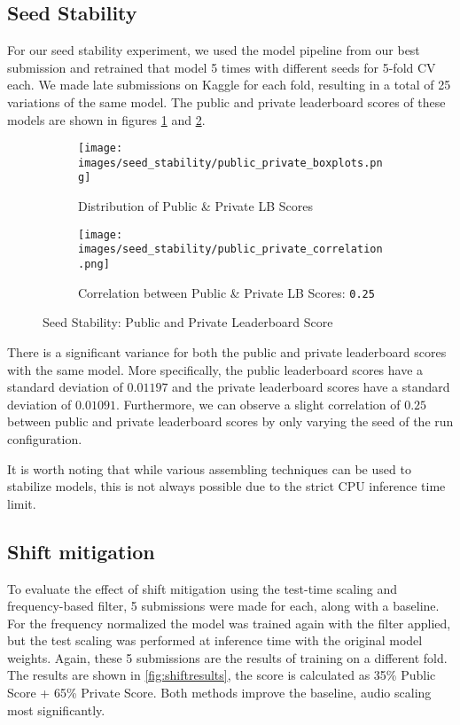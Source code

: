 \documentclass[
]{ceurart}
\begin{document}
\subsection{Seed Stability} \label{seed}

For our seed stability experiment, we used the model pipeline from our best submission and retrained that model 5 times with different seeds for 5-fold CV each. We made late submissions on Kaggle for each fold, resulting in a total of 25 variations of the same model. The public and private leaderboard scores of these models are shown in figures \ref{fig:seed-stability-lb-scores} and \ref{fig:seed-stability-lb-corr}.

\begin{figure}[htbp]
    \centering
    \begin{subfigure}[b]{0.39\textwidth}
        \centering
        \texttt{[image: images/seed\_stability/public\_private\_boxplots.png]}
        \caption{Distribution of Public \& Private LB Scores}
        \label{fig:seed-stability-lb-scores}
    \end{subfigure}
    \hfill
    \begin{subfigure}[b]{0.6\textwidth}
        \centering
        \texttt{[image: images/seed\_stability/public\_private\_correlation.png]}
        \caption{Correlation between Public \& Private LB Scores: \texttt{0.25}}
        \label{fig:seed-stability-lb-corr}
    \end{subfigure}
    \caption{Seed Stability: Public and Private Leaderboard Score}
    \label{fig:seed-stability}
\end{figure}

There is a significant variance for both the public and private leaderboard scores with the same model. More specifically, the public leaderboard scores have a standard deviation of $0.01197$ and the private leaderboard scores have a standard deviation of $0.01091$. Furthermore, we can observe a slight correlation of $0.25$ between public and private leaderboard scores by only varying the seed of the run configuration.

It is worth noting that while various assembling techniques can be used to stabilize models, this is not always possible due to the strict CPU inference time limit.

\subsection{Shift mitigation}
To evaluate the effect of shift mitigation using the test-time scaling and frequency-based filter, 5 submissions were made for each, along with a baseline. For the frequency normalized the model was trained again with the filter applied, but the test scaling was performed at inference time with the original model weights. Again, these 5 submissions are the results of training on a different fold. The results are shown in \ref{fig:shiftresults}, the score is calculated as 35\% Public Score + 65\% Private Score. Both methods improve the baseline, audio scaling most significantly.
\end{document}
